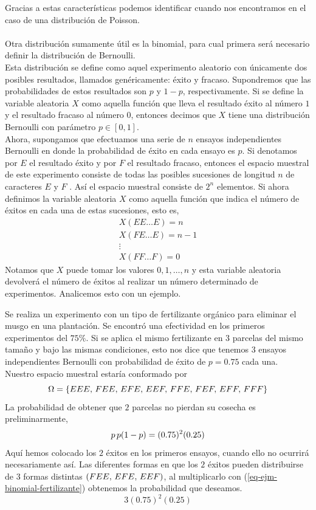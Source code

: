 Gracias a estas características podemos identificar cuando nos encontramos en el caso de una distribución de Poisson. \\\\
Otra distribución sumamente útil es la binomial, para cual primera será necesario definir la distribución de Bernoulli.\\ Esta distribución se define como aquel experimento aleatorio con únicamente dos posibles resultados, llamados genéricamente: éxito y fracaso.
Supondremos que las probabilidades de estos resultados son $p$ y $1-p$, respectivamente. Si se define la variable aleatoria $X$ como aquella función que lleva el resultado éxito al número $1$ y el resultado fracaso al número $0$, entonces decimos que $X$ tiene una distribución Bernoulli con parámetro $p\in[0,1]$.\\
Ahora, supongamos que efectuamos una serie de $n$  ensayos independientes Bernoulli en donde la probabilidad de éxito en cada ensayo es $p$. Si denotamos por $E$ el resultado éxito y por $F$ el resultado fracaso, entonces el espacio muestral de este experimento consiste de todas las posibles sucesiones de longitud $n$ de caracteres $E$ y $F$ . Así el espacio muestral consiste de $2^n$ elementos. Si ahora definimos la variable aleatoria $X$ como aquella función que indica el número de éxitos en cada una de estas sucesiones, esto es,
\begin{eqnarray*}
    X(E E\ldots E)=n\\ X(FE\ldots E)=n-1\\ \vdots\\X(F F\ldots F)=0
\end{eqnarray*}
Notamos que $X$  puede tomar los valores $0,1,\ldots,n$  y esta variable aleatoria devolverá el número de éxitos al realizar un número determinado de experimentos. Analicemos esto con un ejemplo.
\begin{Ejm}
    Se realiza un experimento con un tipo de fertilizante orgánico para eliminar el musgo en una plantación. Se encontró una efectividad en los primeros experimentos del $75\%$.
    Si se aplica el mismo fertilizante en $3$ parcelas del mismo tamaño y bajo las mismas condiciones, esto nos dice que tenemos $3$ ensayos independientes Bernoulli con probabilidad de éxito de $p=0.75$  cada una.\\
    Nuestro espacio muestral estaría conformado por $$\Omega= \{E E E,\thinspace F E E,\thinspace E F E,\thinspace E E F,\thinspace F F E,\thinspace F E F,\thinspace E F F,\thinspace F F F\}$$
    La probabilidad de obtener que $2$ parcelas no pierdan su cosecha es preliminarmente,
    \begin{eqnarray}
        \label{eq-ejm-binomial-fertilizante}
    	p\thinspace p (1-p)=(0.75)^2(0.25)
    \end{eqnarray}
    Aquí hemos colocado los $2$ éxitos en los primeros ensayos, cuando ello no ocurrirá necesariamente así. Las diferentes formas en que los $2$ éxitos pueden distribuirse de $3$ formas distintas $(F E E,\thinspace E F E,\thinspace E E F)$, al multiplicarlo con (\ref{eq-ejm-binomial-fertilizante}) obtenemos la probabilidad que deseamos. $$3(0.75)^2(0.25)$$
\end{Ejm}

